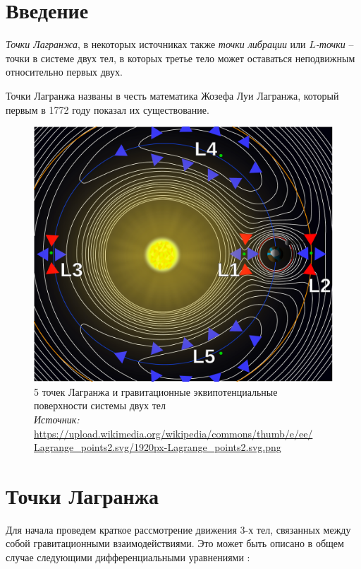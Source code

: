 \documentclass[12pt]{article}
\begin{document}
    \newpage

    \section{Введение}
    \par \textit{Точки Лагранжа}, в некоторых источниках также \textit{точки
    либрации} или \textit{$L$-точки} -- точки в системе двух тел, в которых
    третье тело может оставаться неподвижным относительно первых двух.
    \par Точки Лагранжа названы в честь математика Жозефа Луи Лагранжа,
    который первым в 1772 году показал их существование.

    \begin{figure}[H]
        \centering
        \includegraphics[scale=0.35]{Lagrange_points.pdf}
        \caption{5 точек Лагранжа и гравитационные эквипотенциальные
        поверхности системы двух тел\\
        \textit{Источник:}
        \url{https://upload.wikimedia.org/wikipedia/commons/thumb/e/ee/
        Lagrange_points2.svg/1920px-Lagrange_points2.svg.png}}
        \label{points}
    \end{figure}

    \section{Точки Лагранжа}
    \par Для начала проведем краткое рассмотрение движения 3-х тел, связанных между
    собой гравитационными взаимодействиями. Это может быть описано в общем
    случае следующими дифференциальными уравнениями \cite{mit2008}:
\end{document}
